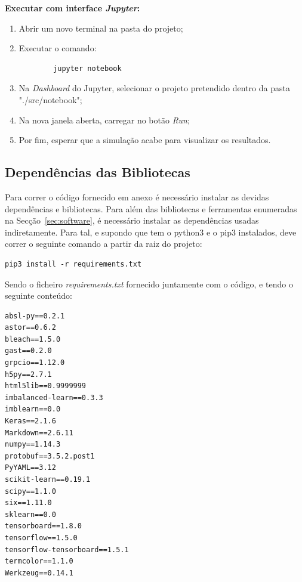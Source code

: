 \documentclass[]{article}
\begin{document}
\textbf{Executar com interface \textit{Jupyter}:}
\begin{enumerate}
  \item Abrir um novo terminal na pasta do projeto;
  \item Executar o comando:
	\begin{lstlisting}
		jupyter notebook
	\end{lstlisting}
  \item Na \textit{Dashboard} do Jupyter, selecionar o projeto pretendido dentro da pasta "./src/notebook";
  \item Na nova janela aberta, carregar no botão \textit{Run};
  \item Por fim, esperar que a simulação acabe para visualizar os resultados.
\end{enumerate}
  	
\subsection{Dependências das Bibliotecas}
Para correr o código fornecido em anexo é necessário instalar as devidas dependências e bibliotecas. Para além das bibliotecas e ferramentas enumeradas na Secção~\ref{sec:software}, é necessário instalar as dependências usadas indiretamente. Para tal, e supondo que tem o python3 e o pip3 instalados, deve correr o seguinte comando a partir da raiz do projeto:
\begin{lstlisting}
pip3 install -r requirements.txt
\end{lstlisting}

Sendo o ficheiro \textit{requirements.txt} fornecido juntamente com o código, e tendo o seguinte conteúdo:

\begin{lstlisting}
absl-py==0.2.1
astor==0.6.2
bleach==1.5.0
gast==0.2.0
grpcio==1.12.0
h5py==2.7.1
html5lib==0.9999999
imbalanced-learn==0.3.3
imblearn==0.0
Keras==2.1.6
Markdown==2.6.11
numpy==1.14.3
protobuf==3.5.2.post1
PyYAML==3.12
scikit-learn==0.19.1
scipy==1.1.0
six==1.11.0
sklearn==0.0
tensorboard==1.8.0
tensorflow==1.5.0
tensorflow-tensorboard==1.5.1
termcolor==1.1.0
Werkzeug==0.14.1
\end{lstlisting}
\end{document}
